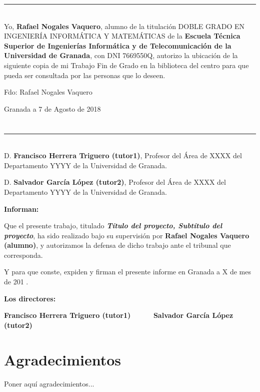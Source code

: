 \noindent\rule[-1ex]{\textwidth}{2pt}\\[4.5ex]

Yo, \textbf{Rafael Nogales Vaquero}, alumno de la titulación DOBLE GRADO EN INGENIERÍA INFORMÁTICA Y MATEMÁTICAS de la \textbf{Escuela Técnica Superior
de Ingenierías Informática y de Telecomunicación de la Universidad de Granada}, con DNI 7669550Q, autorizo la
ubicación de la siguiente copia de mi Trabajo Fin de Grado en la biblioteca del centro para que pueda ser
consultada por las personas que lo deseen.

\vspace{6cm}

\noindent Fdo: Rafael Nogales Vaquero

\vspace{2cm}

\begin{flushright}
Granada a 7 de Agosto de 2018
\end{flushright}


\chapter*{}
\thispagestyle{empty}

\noindent\rule[-1ex]{\textwidth}{2pt}\\[4.5ex]

D. \textbf{Francisco Herrera Triguero  (tutor1)}, Profesor del Área de XXXX del Departamento YYYY de la Universidad de Granada.

\vspace{0.5cm}

D. \textbf{Salvador García López (tutor2)}, Profesor del Área de XXXX del Departamento YYYY de la Universidad de Granada.


\vspace{0.5cm}

\textbf{Informan:}

\vspace{0.5cm}

Que el presente trabajo, titulado \textit{\textbf{Título del proyecto, Subtítulo del proyecto}},
ha sido realizado bajo su supervisión por \textbf{Rafael Nogales Vaquero (alumno)}, y autorizamos la defensa de dicho trabajo ante el tribunal
que corresponda.

\vspace{0.5cm}

Y para que conste, expiden y firman el presente informe en Granada a X de mes de 201 .

\vspace{1cm}

\textbf{Los directores:}

\vspace{5cm}

\noindent \textbf{Francisco Herrera Triguero  (tutor1) \ \ \ \ \ Salvador García López (tutor2)}

\chapter*{Agradecimientos}
\thispagestyle{empty}

       \vspace{1cm}


Poner aquí agradecimientos...

